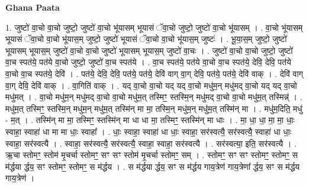 \documentclass[17pt]{extarticle}
\begin{document}
\textbf{Ghana Paata } \newline

1. जुष्टो॑ वा॒चो वा॒चो जुष्टो॒ जुष्टो॑ वा॒चो भू॑यासम् भूयासं ॅवा॒चो जुष्टो॒ जुष्टो॑ वा॒चो भू॑यासम् । . वा॒चो भू॑यासम् भूयासं ॅवा॒चो वा॒चो भू॑यास॒म् जुष्टो॒ जुष्टो॑ भूयासं ॅवा॒चो वा॒चो भू॑यास॒म् जुष्टः॑ । . भू॒या॒स॒म् जुष्टो॒ जुष्टो॑ भूयासम् भूयास॒म् जुष्टो॑ वा॒चो वा॒चो जुष्टो॑ भूयासम् भूयास॒म् जुष्टो॑ वा॒चः । . जुष्टो॑ वा॒चो वा॒चो जुष्टो॒ जुष्टो॑ वा॒च स्पत॑ये॒ पत॑ये वा॒चो जुष्टो॒ जुष्टो॑ वा॒च स्पत॑ये । . वा॒च स्पत॑ये॒ पत॑ये वा॒चो वा॒च स्पत॑ये॒ देवि॒ देवि॒ पत॑ये वा॒चो वा॒च स्पत॑ये॒ देवि॑ । . पत॑ये॒ देवि॒ देवि॒ पत॑ये॒ पत॑ये॒ देवि॑ वाग् वा॒ग् देवि॒ पत॑ये॒ पत॑ये॒ देवि॑ वाक् । . देवि॑ वाग् वा॒ग् देवि॒ देवि॑ वाक् । . वा॒गिति॑ वाक् । . यद् वा॒चो वा॒चो यद् यद् वा॒चो मधु॑म॒न् मधु॑मद् वा॒चो यद् यद् वा॒चो मधु॑मत् । . वा॒चो मधु॑म॒न् मधु॑मद् वा॒चो वा॒चो मधु॑म॒त् तस्मिꣳ॒॒ स्तस्मि॒न् मधु॑मद् वा॒चो वा॒चो मधु॑म॒त् तस्मिन्न्॑ । . मधु॑म॒त् तस्मिꣳ॒॒ स्तस्मि॒न् मधु॑म॒न् मधु॑म॒त् तस्मि॑न् मा मा॒ तस्मि॒न् मधु॑म॒न् मधु॑म॒त् तस्मि॑न् मा । . मधु॑म॒दिति॒ मधु॑ - म॒त् । . तस्मि॑न् मा मा॒ तस्मिꣳ॒॒ स्तस्मि॑न् मा धा धा मा॒ तस्मिꣳ॒॒ स्तस्मि॑न् मा धाः । . मा॒ धा॒ धा॒ मा॒ मा॒ धाः॒ स्वाहा॒ स्वाहा॑ धा मा मा धाः॒ स्वाहा᳚ । . धाः॒ स्वाहा॒ स्वाहा॑ धा धाः॒ स्वाहा॒ सर॑स्वत्यै॒ सर॑स्वत्यै॒ स्वाहा॑ धा धाः॒ स्वाहा॒ सर॑स्वत्यै । . स्वाहा॒ सर॑स्वत्यै॒ सर॑स्वत्यै॒ स्वाहा॒ स्वाहा॒ सर॑स्वत्यै । . सर॑स्वत्या॒ इति॒ सर॑स्वत्यै । . ऋ॒चा स्तोमꣳ॒॒ स्तोम॑ मृ॒चर्चा स्तोमꣳ॒॒ सꣳ सꣳ स्तोम॑ मृ॒चर्चा स्तोमꣳ॒॒ सम् । . स्तोमꣳ॒॒ सꣳ सꣳ स्तोमꣳ॒॒ स्तोमꣳ॒॒ स म॑र्द्धया र्द्धय॒ सꣳ स्तोमꣳ॒॒ स्तोमꣳ॒॒ स म॑र्द्धय । . स म॑र्द्धया र्द्धय॒ सꣳ स म॑र्द्धय गाय॒त्रेण॑ गाय॒त्रेणा᳚ र्द्धय॒ सꣳ स म॑र्द्धय गाय॒त्रेण॑ । \newline
\end{document}
